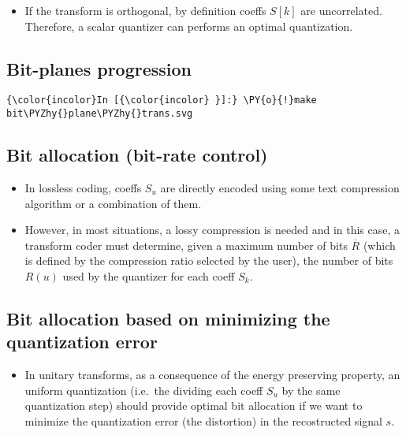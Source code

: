 \begin{itemize}
\tightlist
\item
  If the transform is orthogonal, by definition coeffs \(S[k]\) are
  uncorrelated. Therefore, a scalar quantizer can performs an optimal
  quantization.
\end{itemize}

    \hypertarget{bit-planes-progression}{%
\subsection{Bit-planes progression}\label{bit-planes-progression}}

    \begin{Verbatim}[commandchars=\\\{\}]
{\color{incolor}In [{\color{incolor} }]:} \PY{o}{!}make bit\PYZhy{}plane\PYZhy{}trans.svg
\end{Verbatim}


    

    \hypertarget{bit-allocation-bit-rate-control}{%
\subsection{Bit allocation (bit-rate
control)}\label{bit-allocation-bit-rate-control}}

\begin{itemize}
\item
  In lossless coding, coeffs \(S_u\) are directly encoded using some
  text compression algorithm or a combination of them.
\item
  However, in most situations, a lossy compression is needed and in this
  case, a transform coder must determine, given a maximum number of bits
  \(\overline{R}\) (which is defined by the compression ratio selected
  by the user), the number of bits \(R(u)\) used by the quantizer for
  each coeff \(S_k\).
\end{itemize}

    \hypertarget{bit-allocation-based-on-minimizing-the-quantization-error}{%
\subsection{Bit allocation based on minimizing the quantization
error}\label{bit-allocation-based-on-minimizing-the-quantization-error}}

\begin{itemize}
\tightlist
\item
  In unitary transforms, as a consequence of the energy preserving
  property, an uniform quantization (i.e.~the dividing each coeff
  \(S_u\) by the same quantization step) should provide optimal bit
  allocation if we want to minimize the quantization error (the
  distortion) in the recostructed signal \(s\).
\end{itemize}

